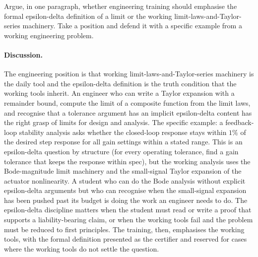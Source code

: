 \begin{exercise}
Argue, in one paragraph, whether engineering training should
emphasise the formal epsilon-delta definition of a limit or the
working limit-laws-and-Taylor-series machinery. Take a position and
defend it with a specific example from a working engineering problem.

\paragraph{Discussion.} The engineering position is that working
limit-laws-and-Taylor-series machinery is the daily tool and the
epsilon-delta definition is the truth condition that the working
tools inherit. An engineer who can write a Taylor expansion with a
remainder bound, compute the limit of a composite function from the
limit laws, and recognise that a tolerance argument has an implicit
epsilon-delta content has the right grasp of limits for design and
analysis. The specific example: a feedback-loop stability analysis
asks whether the closed-loop response stays within $1\%$ of the
desired step response for all gain settings within a stated range.
This is an epsilon-delta question by structure (for every operating
tolerance, find a gain tolerance that keeps the response within
spec), but the working analysis uses the Bode-magnitude limit
machinery and the small-signal Taylor expansion of the actuator
nonlinearity. A student who can do the Bode analysis without
explicit epsilon-delta arguments but who can recognise when the
small-signal expansion has been pushed past its budget is doing the
work an engineer needs to do. The epsilon-delta discipline matters
when the student must read or write a proof that supports a
liability-bearing claim, or when the working tools fail and the
problem must be reduced to first principles. The training, then,
emphasises the working tools, with the formal definition presented
as the certifier and reserved for cases where the working tools do
not settle the question.
\end{exercise}
